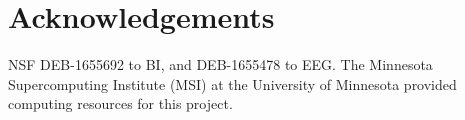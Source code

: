 \documentclass[11pt]{article}
\begin{document}
\clearpage





\section{Acknowledgements}

NSF DEB-1655692 to BI, and DEB-1655478 to EEG.
The Minnesota Supercomputing Institute (MSI) at the University of Minnesota provided computing resources for this project.


\clearpage


\setstretch{\stretchby}
\end{document}
